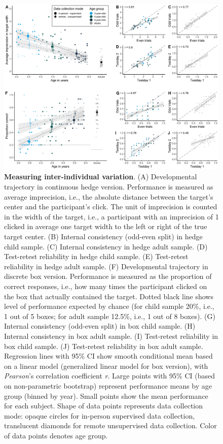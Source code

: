 \documentclass[
  man,floatsintext]{apa6}
\begin{document}
\begin{figure}

{\centering \includegraphics[width=1\linewidth]{../figures/gafo_results} 

}

\caption{\textbf{Measuring inter-individual variation}.
(A) Developmental trajectory in continuous hedge version. Performance is measured as average imprecision, i.e., the absolute distance between the target's center and the participant's click. The unit of imprecision is counted in the width of the target, i.e., a participant with an imprecision of 1 clicked in average one target width to the left or right of the true target center.
(B) Internal consistency (odd-even split) in hedge child sample. (C) Internal consistency in hedge adult sample. (D) Test-retest reliability in hedge child sample. (E) Test-retest reliability in hedge adult sample.
(F) Developmental trajectory in discrete box version. Performance is measured as the proportion of correct responses, i.e., how many times the participant clicked on the box that actually contained the target. Dotted black line shows level of performance expected by chance (for child sample 20\%, i.e., 1 out of 5 boxes; for adult sample 12.5\%, i.e., 1 out of 8 boxes).
(G) Internal consistency (odd-even split) in box child sample. (H) Internal consistency in box adult sample. (I) Test-retest reliability in box child sample. (J) Test-retest reliability in box adult sample.
Regression lines with 95\% CI show smooth conditional mean based on a linear model (generalized linear model for box version), with \emph{Pearson}'s correlation coefficient \emph{r}.
Large points with 95\% CI (based on non-parametric bootstrap) represent performance means by age group (binned by year).
Small points show the mean performance for each subject. Shape of data points represents data collection mode: opaque circles for in-person supervised data collection, translucent diamonds for remote unsupervised data collection. Color of data points denotes age group.}\label{fig:fig2}
\end{figure}
\end{document}
